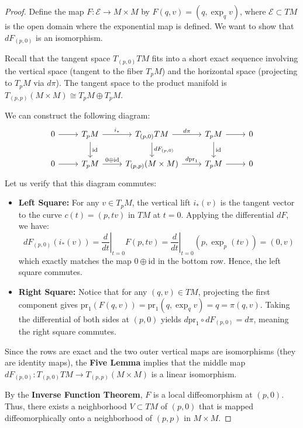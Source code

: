 \documentclass[11pt, a4paper]{article}
\theoremstyle{plain}
\theoremstyle{definition}
\theoremstyle{remark}
\begin{document}
\begin{proof}
Define the map $F: \mathcal{E} \to M \times M$ by $F(q, v) = (q, \exp_q v)$, where $\mathcal{E} \subset TM$ is the open domain where the exponential map is defined. We want to show that $dF_{(p,0)}$ is an isomorphism.

Recall that the tangent space $T_{(p,0)}TM$ fits into a short exact sequence involving the vertical space (tangent to the fiber $T_p M$) and the horizontal space (projecting to $T_p M$ via $d\pi$). The tangent space to the product manifold is $T_{(p,p)}(M \times M) \cong T_p M \oplus T_p M$. 

We can construct the following diagram:
\[
\begin{tikzcd}
    0 \arrow[r] & T_p M \arrow[r, "i_*"] \arrow[d, "\text{id}"] & T_{(p,0)} TM \arrow[r, "d\pi"] \arrow[d, "dF_{(p,0)}"] & T_p M \arrow[r] \arrow[d, "\text{id}"] & 0 \\
    0 \arrow[r] & T_p M \arrow[r, "0 \oplus \text{id}"] & T_{(p,p)}(M \times M) \arrow[r, "d\text{pr}_1"] & T_p M \arrow[r] & 0
\end{tikzcd}
\]
Let us verify that this diagram commutes:
\begin{itemize}
    \item \textbf{Left Square:} For any $v \in T_p M$, the vertical lift $i_*(v)$ is the tangent vector to the curve $c(t) = (p, tv)$ in $TM$ at $t=0$. Applying the differential $dF$, we have:
    \[
    dF_{(p,0)}(i_*(v)) = \left. \frac{d}{dt} \right|_{t=0} F(p, tv) = \left. \frac{d}{dt} \right|_{t=0} (p, \exp_p(tv)) = (0, v)
    \]
    which exactly matches the map $0 \oplus \text{id}$ in the bottom row. Hence, the left square commutes.
    \item \textbf{Right Square:} Notice that for any $(q,v) \in TM$, projecting the first component gives $\text{pr}_1(F(q,v)) = \text{pr}_1(q, \exp_q v) = q = \pi(q,v)$. Taking the differential of both sides at $(p,0)$ yields $d\text{pr}_1 \circ dF_{(p,0)} = d\pi$, meaning the right square commutes.
\end{itemize}

Since the rows are exact and the two outer vertical maps are isomorphisms (they are identity maps), the \textbf{Five Lemma} implies that the middle map $dF_{(p,0)}: T_{(p,0)}TM \to T_{(p,p)}(M \times M)$ is a linear isomorphism.

By the \textbf{Inverse Function Theorem}, $F$ is a local diffeomorphism at $(p,0)$. Thus, there exists a neighborhood $V \subset TM$ of $(p,0)$ that is mapped diffeomorphically onto a neighborhood of $(p,p)$ in $M \times M$.


\end{proof}
\end{document}
